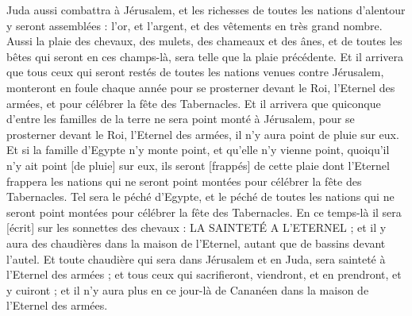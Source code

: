 \begin{multicols}{2}
Juda aussi combattra à Jérusalem, et les richesses de toutes les nations d'alentour y seront assemblées : l'or, et l'argent, et des vêtements en très grand nombre.
Aussi la plaie des chevaux, des mulets, des chameaux et des ânes, et de toutes les bêtes qui seront en ces champs-là, sera telle que la plaie précédente.
Et il arrivera que tous ceux qui seront restés de toutes les nations venues contre Jérusalem, monteront en foule chaque année pour se prosterner devant le Roi, l'Eternel des armées, et pour célébrer la fête des Tabernacles.
Et il arrivera que quiconque d'entre les familles de la terre ne sera point monté à Jérusalem, pour se prosterner devant le Roi, l'Eternel des armées, il n'y aura point de pluie sur eux.
Et si la famille d'Egypte n'y monte point, et qu'elle n'y vienne point, quoiqu'il n'y ait point [de pluie] sur eux, ils seront [frappés] de cette plaie dont l'Eternel frappera les nations qui ne seront point montées pour célébrer la fête des Tabernacles.
Tel sera le péché d'Egypte, et le péché de toutes les nations qui ne seront point montées pour célébrer la fête des Tabernacles.
En ce temps-là il sera [écrit] sur les sonnettes des chevaux : LA SAINTETÉ A L'ETERNEL ; et il y aura des chaudières dans la maison de l'Eternel, autant que de bassins devant l'autel.
Et toute chaudière qui sera dans Jérusalem et en Juda, sera sainteté à l'Eternel des armées ; et tous ceux qui sacrifieront, viendront, et en prendront, et y cuiront ; et il n'y aura plus en ce jour-là de Cananéen dans la maison de l'Eternel des armées.
\PPE{}
\end{multicols}
